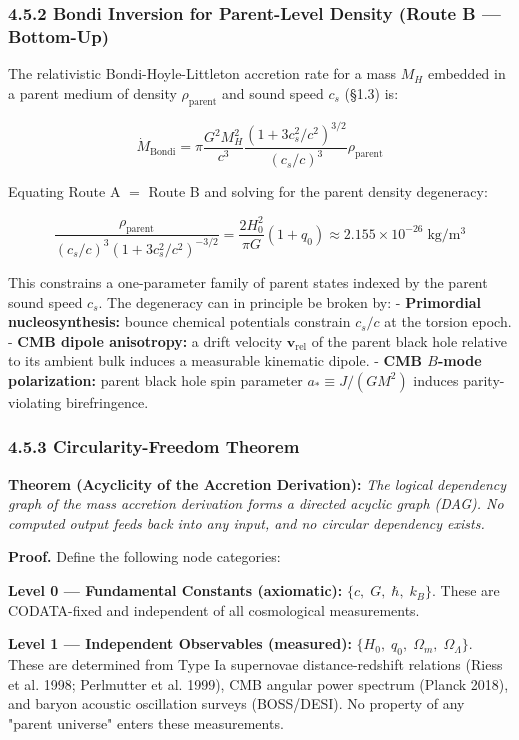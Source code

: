 \documentclass[11pt,a4paper]{article}
\theoremstyle{definition}\newtheorem{definition}{Definition}
\theoremstyle{remark}\newtheorem{remark}{Remark}
\begin{document}
\subsubsection{4.5.2 Bondi Inversion for Parent-Level Density (Route B — Bottom-Up)}

The relativistic Bondi-Hoyle-Littleton accretion rate for a mass $M_H$ embedded in a parent medium of density $\rho_{\text{parent}}$ and sound speed $c_s$ (§1.3) is:


\begin{equation}
\dot{M}_{\text{Bondi}} = \pi \frac{G^2 M_H^2}{c^3} \frac{(1 + 3 c_s^2/c^2)^{3/2}}{(c_s/c)^3} \rho_{\text{parent}}
\end{equation}


Equating Route A $=$ Route B and solving for the parent density degeneracy:


\begin{equation}
\boxed{\frac{\rho_{\text{parent}}}{(c_s/c)^3 (1 + 3 c_s^2/c^2)^{-3/2}} = \frac{2 H_0^2}{\pi G}(1 + q_0) \approx 2.155 \times 10^{-26} \; \mathrm{kg/m^3}}
\end{equation}


This constrains a one-parameter family of parent states indexed by the parent sound speed $c_s$. The degeneracy can in principle be broken by:
- \textbf{Primordial nucleosynthesis:} bounce chemical potentials constrain $c_s / c$ at the torsion epoch.
- \textbf{CMB dipole anisotropy:} a drift velocity $\mathbf{v}_{\text{rel}}$ of the parent black hole relative to its ambient bulk induces a measurable kinematic dipole.
- \textbf{CMB $B$-mode polarization:} parent black hole spin parameter $a_* \equiv J/(GM^2)$ induces parity-violating birefringence.
\subsubsection{4.5.3 Circularity-Freedom Theorem}

\textbf{Theorem (Acyclicity of the Accretion Derivation):} \textit{The logical dependency graph of the mass accretion derivation forms a directed acyclic graph (DAG). No computed output feeds back into any input, and no circular dependency exists.}

\textbf{Proof.} Define the following node categories:

\textbf{Level 0 — Fundamental Constants (axiomatic):} $\{c, \; G, \; \hbar, \; k_B\}$. These are CODATA-fixed and independent of all cosmological measurements.

\textbf{Level 1 — Independent Observables (measured):} $\{H_0, \; q_0, \; \Omega_m, \; \Omega_\Lambda\}$. These are determined from Type Ia supernovae distance-redshift relations (Riess et al. 1998; Perlmutter et al. 1999), CMB angular power spectrum (Planck 2018), and baryon acoustic oscillation surveys (BOSS/DESI). No property of any "parent universe" enters these measurements.
\end{document}
